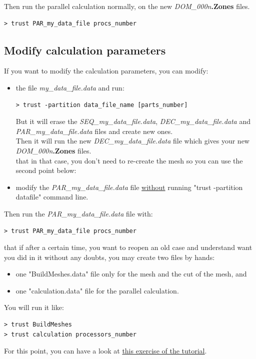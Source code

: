 Then run the parallel calculation normally, on the new \textit{DOM\_000n}\textbf{.Zones} files.
\begin{verbatim}
> trust PAR_my_data_file procs_number
\end{verbatim}




\subsection{Modify calculation parameters}
If you want to modify the calculation parameters, you can modify:
\begin{itemize} 
\item the file \textit{my\_data\_file.data} and run:
\begin{verbatim}
> trust -partition data_file_name [parts_number]
\end{verbatim}
But it will erase the \textit{SEQ\_my\_data\_file.data}, \textit{DEC\_my\_data\_file.data} and \\
\textit{PAR\_my\_data\_file.data} files and create new ones.\\
Then it will run the new \textit{DEC\_my\_data\_file.data} file which gives your new \textit{DOM\_000n}\textbf{.Zones} files.\\
\Note that in that case, you don't need to re-create the mesh so you can use the second point below:
\item modify the \textit{PAR\_my\_data\_file.data} file \underline{without} running "trust -partition datafile" command line.
\end{itemize}
Then run the \textit{PAR\_my\_data\_file.data} file with:
\begin{verbatim}
> trust PAR_my_data_file procs_number
\end{verbatim}

\Note that if after a certain time, you want to reopen an old case and understand want you did in it without any doubts, you may create two files by hands:
\begin{itemize} 
\item one "BuildMeshes.data" file only for the mesh and the cut of the mesh, and
\item one "calculation.data" file for the parallel calculation. 
\end{itemize}
You will run it like:
\begin{verbatim}
> trust BuildMeshes
> trust calculation processors_number
\end{verbatim}

For this point, you can have a look at \href{TRUST_tutorial.pdf\#prm_para}{this exercise of the \trust tutorial}.





